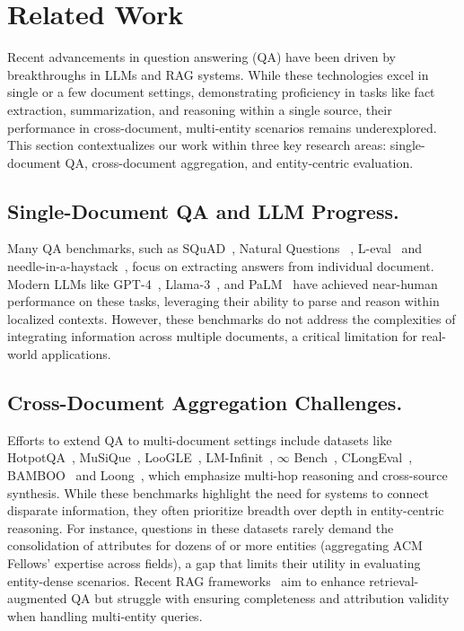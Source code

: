 \section{Related Work}
Recent advancements in question answering (QA) have been driven by breakthroughs in LLMs and RAG systems. While these technologies excel in single or a few document settings, demonstrating proficiency in tasks like fact extraction, summarization, and reasoning within a single source, their performance in cross-document, multi-entity scenarios remains underexplored. This section contextualizes our work within three key research areas: single-document QA, cross-document aggregation, and entity-centric evaluation.

\subsection{Single-Document QA and LLM Progress.}
Many QA benchmarks, such as SQuAD~\citep{2016SQuAD}, Natural Questions ~\citep{2019Natural}, L-eval~\citep{an-etal-2024-l} and needle-in-a-haystack~\citep{Kamradt2023}, focus on extracting answers from individual document.  Modern LLMs like GPT-4~\citep{achiam2023gpt}, Llama-3~\citep{Llama3_2024}, and PaLM~\citep{2023PaLM} have achieved near-human performance on these tasks, leveraging their ability to parse and reason within localized contexts.  However, these benchmarks do not address the complexities of integrating information across multiple documents, a critical limitation for real-world applications.

\subsection{Cross-Document Aggregation Challenges.}
Efforts to extend QA to multi-document settings include datasets like HotpotQA~\citep{2018HotpotQA}, MuSiQue~\citep{2021MuSiQue}, LooGLE~\citep{li2024loogle}, LM-Infinit~\citep{han-etal-2024-lm}, $\infty$ Bench~\citep{zhang2024inftybench}, CLongEval~\citep{qiu2024clong}, BAMBOO~\citep{dong-etal-2024-bamboo} and Loong~\citep{2024Leave}, which emphasize multi-hop reasoning and cross-source synthesis. While these benchmarks highlight the need for systems to connect disparate information, they often prioritize breadth over depth in entity-centric reasoning. For instance, questions in these datasets rarely demand the consolidation of attributes for dozens of or more entities (\eg aggregating ACM Fellows’ expertise across fields), a gap that limits their utility in evaluating entity-dense scenarios. Recent RAG frameworks~\citep{fan2024Asurvey} aim to enhance retrieval-augmented QA but struggle with ensuring completeness and attribution validity when handling multi-entity queries.


